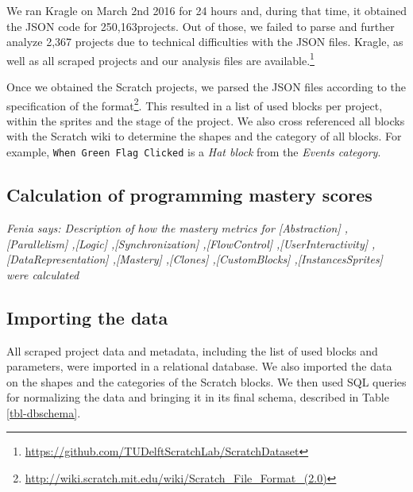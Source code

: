 \documentclass[10pt, conference]{IEEEtran}
\newcommand{\nPrograms}{250,163}
\newcommand{\fenia}[1]{\emph{\color{blue}Fenia says: #1}}
\begin{document}
We ran Kragle on March 2nd 2016 for 24 hours and, during that time, it obtained the JSON code for \nPrograms projects. Out of those, we failed to parse and further analyze 2,367 projects due to technical difficulties with the JSON files.
Kragle, as well as all scraped projects and our analysis files are available.\footnote{\label{repo}\url{https://github.com/TUDelftScratchLab/ScratchDataset}}

Once we obtained the Scratch projects, we parsed the JSON files according to the specification of the format\footnote{\url{http://wiki.scratch.mit.edu/wiki/Scratch_File_Format_(2.0)}}.
This resulted in a list of used blocks per project, within the sprites and the stage of the project.
We also cross referenced all blocks with the Scratch wiki to determine the shapes and the category of all blocks.
For example, \texttt{When Green Flag Clicked} is a \emph{Hat block} from the \emph{Events category}.

\subsection{Calculation of programming mastery scores}
\fenia{Description of how the mastery metrics for       
	[Abstraction]
	,[Parallelism]
	,[Logic]
	,[Synchronization]
	,[FlowControl]
	,[UserInteractivity]
	,[DataRepresentation]
	,[Mastery]
	,[Clones]
	,[CustomBlocks]
	,[InstancesSprites]
	were calculated}

\subsection{Importing the data}
\label{dataAnalysis}
All scraped project data and metadata, including the list of used blocks and parameters, were imported in a relational database.
We also imported the data on the shapes and the categories of the Scratch blocks.
We then used SQL queries for normalizing the data and bringing it in its final schema, described in Table \ref{tbl-dbschema}.
\end{document}

